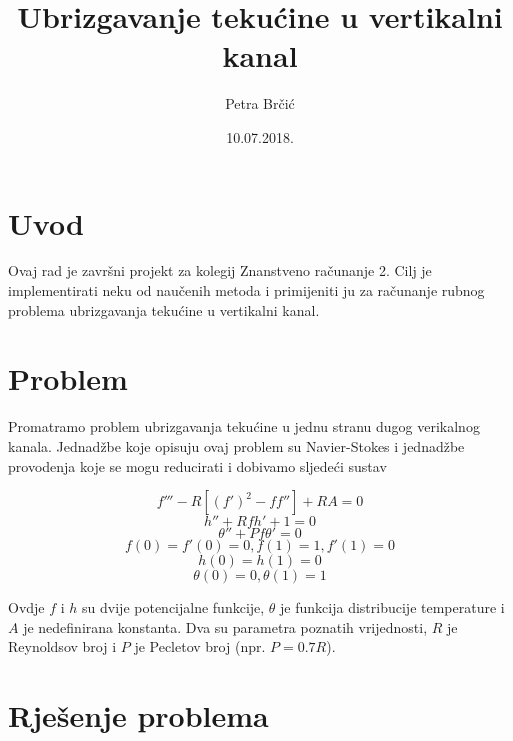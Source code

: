 \documentclass[a4paper]{article}
\title{Ubrizgavanje tekućine u vertikalni kanal}
\author{Petra Brčić}
\date{10.07.2018.}
\begin{document}
\maketitle

\section{Uvod}



Ovaj rad je završni projekt za kolegij Znanstveno računanje 2. Cilj je implementirati neku od naučenih metoda i primijeniti ju za računanje rubnog problema ubrizgavanja tekućine u vertikalni kanal. 

\section{Problem}
Promatramo problem ubrizgavanja tekućine u jednu stranu dugog verikalnog kanala. Jednadžbe koje opisuju ovaj problem su Navier-Stokes i jednadžbe provodenja koje se mogu reducirati i dobivamo sljedeći sustav

\[ f''' - R [(f')^2 - ff''] + RA = 0 \]
\[ h'' + Rfh' + 1 = 0 \]
\[ \theta'' + Pf\theta' = 0 \]
\[ f(0)=f'(0)=0, f(1)=1, f'(1)=0 \]
\[ h(0)=h(1)=0 \]
\[ \theta(0)=0, \theta(1)=1 \]

Ovdje $f$ i $h$ su dvije potencijalne funkcije, $\theta$ je funkcija distribucije temperature i $A$ je nedefinirana konstanta. Dva su parametra poznatih vrijednosti, $R$ je Reynoldsov broj i $P$ je Pecletov broj (npr. $P=0.7R$).\\


\section{Rješenje problema}
\end{document}
